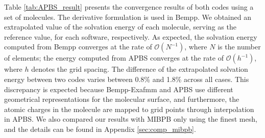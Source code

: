 Table \ref{tab:APBS_result} presents the convergence results of both codes using a set of molecules.
The derivative formulation is used in Bempp.
We obtained an extrapolated value of the solvation energy of each molecule, serving as the reference value, for each software, respectively.
As expected, the solvation energy computed from Bempp converges at the rate of $\mathcal{O}(N^{-1})$, where $N$ is the number of elements;
the energy computed from APBS converges at the rate of $\mathcal{O}(h^{-1})$, where $h$ denotes the grid spacing.
The difference of the extrapolated solvation energy between two codes varies between 0.8\% and 1.8\% across all cases.
This discrepancy is expected because Bempp-Exafmm and APBS use different geometrical representations for the molecular surface, and furthermore, the atomic charges in the molecule are mapped to grid points through interpolation in APBS.
We also compared our results with MIBPB \cite{chen2011mibpb} only using the finest mesh, and the details can be found in Appendix \ref{sec:comp_mibpb}.

